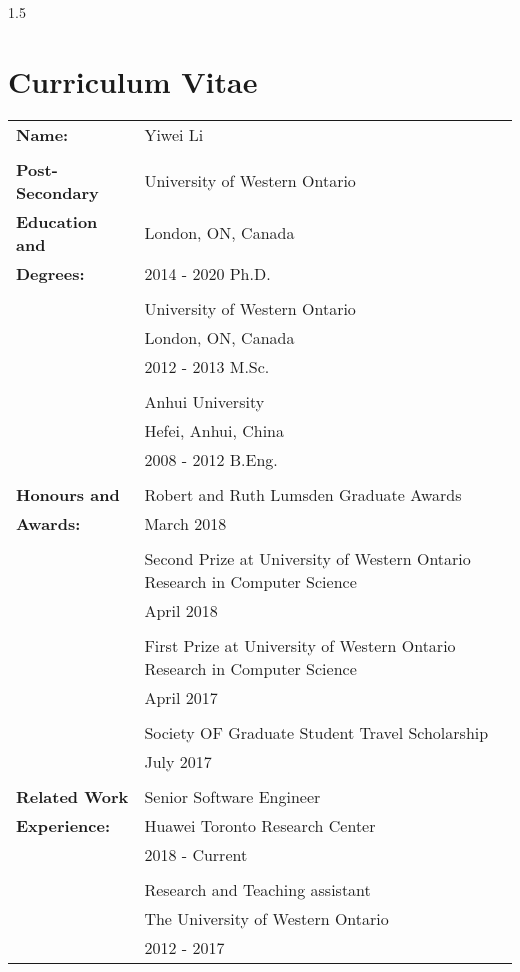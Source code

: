 \documentclass[12pt,twoside]{report}
\numberwithin{figure}{chapter}
\def\normalspacing{1.5} %
\newcommand{\firstname}{Yiwei}
\newcommand{\lastname}{Li}
\begin{document}
\begin{spacing}{\normalspacing}
\chapter*{Curriculum Vitae}
\begin{table}[ht]
\begin{tabular}{ll}
\textbf{Name:} & \firstname{} \lastname\\\\
\textbf{Post-Secondary} & University of Western Ontario\\
\textbf{Education and}& London, ON, Canada\\
\textbf{Degrees:}& 2014 - 2020 Ph.D.\\\\
& University of Western Ontario\\
& London, ON, Canada\\
& 2012 - 2013 M.Sc.\\\\
& Anhui University\\
& Hefei, Anhui, China\\
& 2008 - 2012 B.Eng.\\\\
\textbf{Honours and}& Robert and Ruth Lumsden Graduate Awards\\
\textbf{Awards:}& March 2018\\\\
& Second Prize at University of Western Ontario Research in Computer Science\\
& April 2018\\\\
& First Prize at University of Western Ontario Research in Computer Science\\
& April 2017\\\\
& Society OF Graduate Student Travel Scholarship\\
& July 2017\\\\
\textbf{Related Work}& Senior Software Engineer\\
\textbf{Experience:}& Huawei Toronto Research Center\\
& 2018 - Current\\\\
& Research and Teaching assistant\\
& The University of Western Ontario\\
& 2012 - 2017\\
\end{tabular}
\end{table}

\end{spacing}
\end{document}
